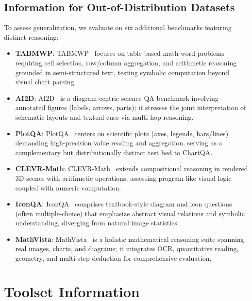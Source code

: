 \subsection{Information for Out-of-Distribution Datasets}
To assess generalization, we evaluate on six additional benchmarks featuring distinct reasoning:
\begin{itemize}
    \item \textbf{TABMWP}: TABMWP~\cite{lu2022dynamic} focuses on table-based math word problems requiring cell selection, row/column aggregation, and arithmetic reasoning grounded in semi-structured text, testing symbolic computation beyond visual chart parsing.
    \item \textbf{AI2D}: AI2D~\cite{kembhavi2016diagram} is a diagram-centric science QA benchmark involving annotated figures (labels, arrows, parts); it stresses the joint interpretation of schematic layouts and textual cues via multi-hop reasoning.
    \item \textbf{PlotQA}: PlotQA~\cite{methani2020plotqa} centers on scientific plots (axes, legends, bars/lines) demanding high-precision value reading and aggregation, serving as a complementary but distributionally distinct test bed to ChartQA.
    \item \textbf{CLEVR-Math}: CLEVR-Math~\cite{lindstrom2022clevr} extends compositional reasoning in rendered 3D scenes with arithmetic operations, assessing program-like visual logic coupled with numeric computation.
    \item \textbf{IconQA}: IconQA~\cite{lu2021iconqa} comprises textbook-style diagram and icon questions (often multiple-choice) that emphasize abstract visual relations and symbolic understanding, diverging from natural image statistics.
    \item \textbf{MathVista}: MathVista~\cite{lu2023mathvista} is a holistic mathematical reasoning suite spanning real images, charts, and diagrams; it integrates OCR, quantitative reading, geometry, and multi-step deduction for comprehensive evaluation.
\end{itemize}



\section{Toolset Information}
\label{app:tool}

  
